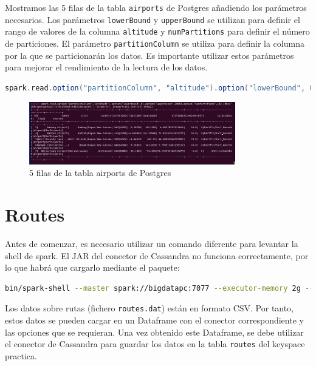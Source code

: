 Mostramos las 5 filas de la tabla \texttt{airports} de Postgres añadiendo los parámetros necesarios. Los parámetros \texttt{lowerBound} y \texttt{upperBound} se utilizan para definir el rango de valores de la columna \texttt{altitude} y \texttt{numPartitions} para definir el número de particiones. El parámetro \texttt{partitionColumn} se utiliza para definir la columna por la que se particionarán los datos. Es importante utilizar estos parámetros para mejorar el rendimiento de la lectura de los datos.

\begin{lstlisting}[language=scala]
spark.read.option("partitionColumn", "altitude").option("lowerBound", 0).option("upperBound", 2000).option("numPartitions", 10).jdbc("jdbc:postgresql://localhost:5432/postgres", "airports", properties).limit(5).show()
\end{lstlisting}

\begin{figure}[H]
    \centering
    \includegraphics[width=0.8\textwidth]{figures/50.png}
    \caption{5 filas de la tabla airports de Postgres}
    \label{fig:airports_postgres_data}
\end{figure}

\section{Routes}

Antes de comenzar, es necesario utilizar un comando diferente para levantar la shell de spark. El JAR del conector de Cassandra no funciona correctamente, por lo que habrá que cargarlo mediante el paquete:

\begin{lstlisting}[language=bash]
bin/spark-shell --master spark://bigdatapc:7077 --executor-memory 2g --executor-cores 2 --jars jars/postgresql-42.7.3.jar  --packages com.datastax.spark:spark-cassandra-connector_2.12:3.3.0 --conf spark.cassandra.connection.host=localhost
\end{lstlisting}

Los datos sobre rutas (fichero \texttt{routes.dat}) están en formato CSV. Por tanto, estos datos se pueden cargar en un Dataframe con el conector correspondiente y las opciones que se requieran. Una vez obtenido este Dataframe, se debe utilizar el conector de Cassandra para guardar los datos en la tabla \texttt{routes} del keyspace practica.

